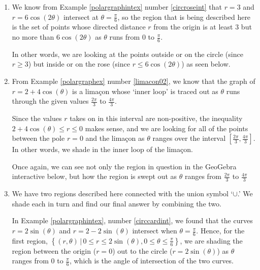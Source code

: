 \documentclass{ximera}
\begin{document}
\begin{example}
\begin{explanation}
\begin{enumerate}
\begin{center}
\end{center}

\item  We know from Example \ref{polargraphintex} number \ref{circroseint} that $r=3$ and $r = 6\cos(2\theta)$ intersect at $\theta = \frac{\pi}{6}$, so the region that is being described here is the set of points whose directed distance $r$ from the origin is at least $3$ but no more than $6\cos(2\theta)$ as $\theta$ runs from $0$ to $\frac{\pi}{6}$. 

 In other words, we are looking at the points outside or on the circle (since $r \geq 3$) but inside or on the rose (since $r \leq 6\cos(2\theta)$) as seen below.

\begin{center}
\end{center}

\item From Example \ref{polargraphex} number \ref{limacon02}, we know that the graph of $r = 2+4\cos(\theta)$ is a lima\c{c}on whose `inner loop' is traced out as $\theta$ runs through the given values $\frac{2\pi}{3}$ to $\frac{4\pi}{3}$.  

Since the values $r$ takes on in this interval are non-positive, the inequality $2+4\cos(\theta) \leq r \leq 0$ makes sense, and we are looking for all of the points between the pole $r = 0$ and the lima\c{c}on as $\theta$ ranges over the interval $\left[\frac{2\pi}{3}, \frac{4\pi}{3}\right]$.  In other words, we shade in the inner loop of the lima\c{c}on.

Once again, we can see not only the region in question in the GeoGebra interactive below, but how the region is swept out as $\theta$ ranges from $\frac{2\pi}{3}$ to $\frac{4\pi}{3}$

\begin{center}
\end{center}

\item  We have two regions described here connected with the union symbol `$\cup$.' We shade each in turn and find our final answer by combining the two. 

In Example \ref{polargraphintex}, number \ref{circcardint}, we found that the curves $r = 2\sin(\theta)$ and $r = 2-2\sin(\theta)$ intersect when $\theta = \frac{\pi}{6}$.    Hence, for the first region, $ \left\{ (r,\theta) \, | \, 0\leq r \leq 2\sin(\theta),  0 \leq \theta \leq \frac{\pi}{6} \right\}$,  we are shading the region between the origin ($r=0$) out to the circle ($r = 2\sin(\theta)$) as $\theta$ ranges from $0$ to $\frac{\pi}{6}$, which is the angle of intersection of the two curves. 


\end{enumerate}
\end{explanation}
\end{example}
\end{document}
